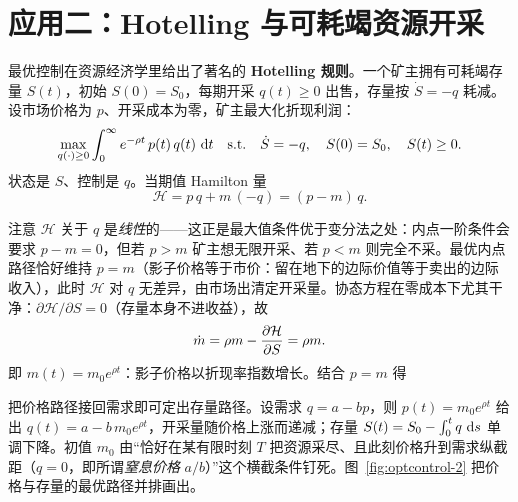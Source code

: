 \section{应用二：Hotelling 与可耗竭资源开采}
\label{sec:optcontrol-6}

最优控制在资源经济学里给出了著名的 \textbf{Hotelling 规则}。一个矿主拥有可耗竭存量 $S(t)$，初始 $S(0)=S_0$，每期开采 $q(t)\ge 0$ 出售，存量按 $\dot S=-q$ 耗减。设市场价格为 $p$、开采成本为零，矿主最大化折现利润：
\[
    \max_{q(\cdot)\ge 0}\int_0^\infty e^{-\rho t}\,p(t)\,q(t)\,\mathop{}\!\mathrm{d} t
    \quad\text{s.t.}\quad
    \dot S=-q,\quad S(0)=S_0,\quad S(t)\ge 0 .
\]
状态是 $S$、控制是 $q$。当期值 Hamilton 量
\[
    \mathcal H=p\,q+m\,(-q)=(p-m)\,q .
\]

注意 $\mathcal H$ 关于 $q$ 是\emph{线性}的——这正是最大值条件优于变分法之处：内点一阶条件会要求 $p-m=0$，但若 $p>m$ 矿主想无限开采、若 $p<m$ 则完全不采。最优内点路径恰好维持 $p=m$（影子价格等于市价：留在地下的边际价值等于卖出的边际收入），此时 $\mathcal H$ 对 $q$ 无差异，由市场出清定开采量。协态方程在零成本下尤其干净：$\partial\mathcal H/\partial S=0$（存量本身不进收益），故
\[
    \dot m=\rho m-\frac{\partial \mathcal H}{\partial S}=\rho m .
\]
即 $m(t)=m_0 e^{\rho t}$：影子价格以折现率指数增长。结合 $p=m$ 得


把价格路径接回需求即可定出存量路径。设需求 $q=a-bp$，则 $p(t)=m_0 e^{\rho t}$ 给出 $q(t)=a-b\,m_0 e^{\rho t}$，开采量随价格上涨而递减；存量 $S(t)=S_0-\int_0^t q\,\mathop{}\!\mathrm{d} s$ 单调下降。初值 $m_0$ 由``恰好在某有限时刻 $T$ 把资源采尽、且此刻价格升到需求纵截距（$q=0$，即所谓\emph{窒息价格} $a/b$）''这个横截条件钉死。图~\ref{fig:optcontrol-2} 把价格与存量的最优路径并排画出。

